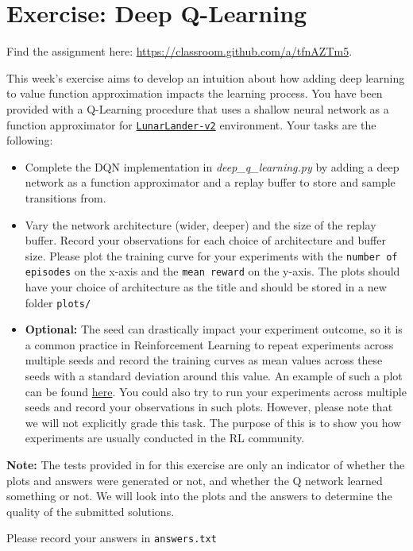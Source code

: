 \documentclass{exam}
\begin{document}
\section*{Exercise: Deep Q-Learning}
Find the assignment here: \url{https://classroom.github.com/a/tfnAZTm5}.

\begin{questions}
        This week's exercise aims to develop an intuition about how adding deep learning to value function approximation impacts the learning process. You have been provided with a Q-Learning procedure that uses a shallow neural network as a function approximator for  \href{https://www.gymlibrary.dev/environments/box2d/lunar_lander/}{\texttt{LunarLander-v2}} environment. Your tasks are the following:
        
	\begin{itemize}
		\item Complete the DQN implementation in \emph{deep\_q\_learning.py} by adding a deep network as      a function approximator and a replay buffer to store and sample transitions from.
            \item Vary the network architecture (wider, deeper) and the size of the replay buffer. Record your observations for each choice of architecture and buffer size. Please plot the training curve for your experiments with the \texttt{number of episodes} on the x-axis and the \texttt{mean reward} on the y-axis. The plots should have your choice of architecture as the title and should be stored in a new folder \texttt{plots/}
            \item \textbf{Optional:} The seed can drastically impact your experiment outcome, so it is a common practice in Reinforcement Learning to repeat experiments across multiple seeds and record the training curves as mean values across these seeds with a standard deviation around this value. An example of such a plot can be found \href{https://encrypted-tbn0.gstatic.com/images?q=tbn:ANd9GcTl8oaD3BtW2TAjT--6Tn0dzYxJL07ahD1G-z5AEG0Op5ZXZFJ5kr7ZcI4XQtdb7TBTWXc&usqp=CAU}{here}. You could also try to run your experiments across multiple seeds and record your observations in such plots. However, please note that we will not explicitly grade this task. The purpose of this is to show you how experiments are usually conducted in the RL community.
	\end{itemize}

        \textbf{Note:} The tests provided in for this exercise are only an indicator of whether the plots and answers were generated or not, and whether the Q network learned something or not. We will look into the plots and the answers to determine the quality of the submitted solutions.
        
\end{questions}

Please record your answers in \texttt{answers.txt}
\end{document}

